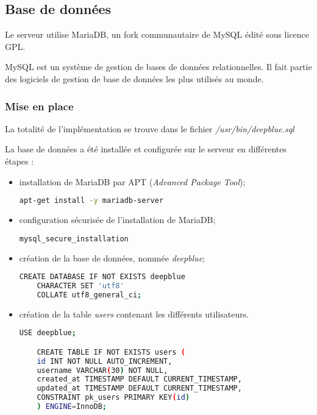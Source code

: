 \subsection{Base de données}
\label{subsec:bd}

Le serveur utilise MariaDB, un fork communautaire de MySQL édité sous licence
GPL.

MySQL est un système de gestion de bases de données relationnelles. Il fait
partie des logiciels de gestion de base de données les plus utilisés au monde.

\subsubsection{Mise en place}
\label{subsubsec:mise-en-place}

La totalité de l'implémentation se trouve dans le fichier
\textit{/usr/bin/deepblue.sql}

La base de données a été installée et configurée sur le serveur en différentes
étapes :
\begin{itemize}
\item installation de MariaDB par APT
  (\emph{Advanced Package Tool});

  \begin{lstlisting}[language=bash]
    apt-get install -y mariadb-server
  \end{lstlisting}

\item configuration sécurisée de l'installation de MariaDB;

  \begin{lstlisting}[language=bash]
    mysql_secure_installation
  \end{lstlisting}

\item création de la base de données, nommée \emph{deepblue};

  \begin{lstlisting}[language=bash]
    CREATE DATABASE IF NOT EXISTS deepblue
    CHARACTER SET 'utf8'
    COLLATE utf8_general_ci;
  \end{lstlisting}

\item création de la table \og \textit{users} \fg contenant les
  différents utilisateurs.

  \begin{lstlisting}[language=bash]
    USE deepblue;

    CREATE TABLE IF NOT EXISTS users (
    id INT NOT NULL AUTO_INCREMENT,
    username VARCHAR(30) NOT NULL,
    created_at TIMESTAMP DEFAULT CURRENT_TIMESTAMP,
    updated_at TIMESTAMP DEFAULT CURRENT_TIMESTAMP,
    CONSTRAINT pk_users PRIMARY KEY(id)
    ) ENGINE=InnoDB;
  \end{lstlisting}
\end{itemize}

